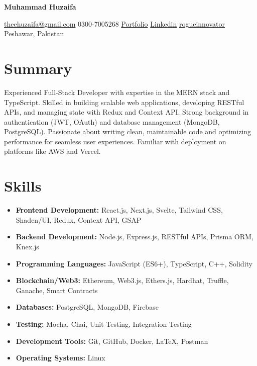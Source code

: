 \documentclass[10pt, letterpaper]{article}
\newenvironment{highlights}{
    \begin{itemize}[
        topsep=0.10 cm,
        parsep=0.10 cm,
        partopsep=0pt,
        itemsep=0pt,
        leftmargin=0.4 cm + 10pt
    ]
}{
    \end{itemize}
}
\newenvironment{header}{
    \setlength{\topsep}{0pt}\par\kern\topsep\centering\color{primaryColor}\linespread{1.5}
}{
    \par\kern\topsep
}
\let\hrefWithoutArrow\href
\renewcommand{\href}[2]{\hrefWithoutArrow{#1}{\ifthenelse{\equal{#2}{}}{ }{#2 }\raisebox{.15ex}{\footnotesize \faExternalLink*}}}
\begin{document}
\newcommand{\AND}{\unskip
	\cleaders\copy\ANDbox\hskip\wd\ANDbox
	\ignorespaces
}
\newsavebox\ANDbox
\sbox\ANDbox{}

\begin{header}
	\centering
	\fontsize{30pt}{30pt}\selectfont
	\textbf{Muhammad Huzaifa}

	\vspace{0.4cm}

	\normalsize
	\hrefWithoutArrow{mailto:theehuzaifa@gmail.com}{{\faEnvelope[regular]}\hspace{0.01cm} theehuzaifa@gmail.com} \quad
	{\faPhone*} \hspace{0.01cm} 0300-7005268 \quad
	\hrefWithoutArrow{https://portfolio-nine-fawn-23.vercel.app/}{{\faLink}\hspace{0.01cm} Portfolio} \quad
	\hrefWithoutArrow{https://www.linkedin.com/in/muhammad-huzaifa-ali-49aa94259/}{{\faLinkedinIn} \hspace{0.01cm}  Linkedin} \quad
	\hrefWithoutArrow{https://github.com/rogueinnovator}{{\faGithub}\hspace{0.01cm}  rogueinnovator} \quad
	{\faMapMarker*} Peshawar, Pakistan
\end{header}
\vspace{0.3 cm - 0.3 cm}
\section{Summary}

Experienced Full-Stack Developer with expertise in the MERN stack  and TypeScript. Skilled in building scalable web applications, developing RESTful APIs, and managing state with Redux and Context API. Strong background in authentication (JWT, OAuth) and database management (MongoDB, PostgreSQL). Passionate about writing clean, maintainable code and optimizing performance for seamless user experiences. Familiar with deployment on platforms like AWS and Vercel.
\section{Skills}
\begin{highlights}
	\item \textbf{Frontend Development:} React.js, Next.js, Svelte, Tailwind CSS, Shadcn/UI, Redux, Context API, GSAP
	\item \textbf{Backend Development:} Node.js, Express.js, RESTful APIs, Prisma ORM, Knex.js
	\item \textbf{Programming Languages:} JavaScript (ES6+), TypeScript, C++, Solidity
	\item \textbf{Blockchain/Web3:} Ethereum, Web3.js, Ethers.js, Hardhat, Truffle, Ganache, Smart Contracts
	\item \textbf{Databases:} PostgreSQL, MongoDB, Firebase
	\item \textbf{Testing:} Mocha, Chai, Unit Testing, Integration Testing
	\item \textbf{Development Tools:} Git, GitHub, Docker, LaTeX, Postman
	\item \textbf{Operating Systems:} Linux
\end{highlights}
\end{document}
